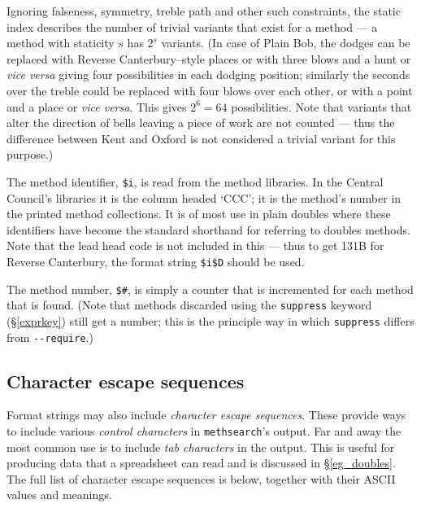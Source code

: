 \documentclass[a4paper,11pt,oneside]{book}
\def\textitidx#1{\textit{#1}\index{#1}}
\def\methsearch{\texttt{meth\-search}}
\newcommand{\sref}[1]{\hyperref[#1]{\S\ref{#1}}}
\begin{document}
Ignoring falseness,
symmetry, treble path and other such constraints, the static index describes
the number of trivial variants that exist for a method
--- a method with staticity $s$ has $2^s$ variants.  
(In case of Plain Bob, the dodges can be replaced with 
Reverse Canterbury--style places 
or with three blows and a hunt or \textit{vice versa} giving four 
possibilities in each dodging position; 
similarly the seconds over the treble could be replaced with four blows over
each other, or with a point and a place or \textit{vice versa}.  This gives
$2^6=64$ possibilities.  Note that variants that alter the direction of bells
leaving a piece of work are not counted --- thus the difference between
Kent and Oxford is not 
considered a trivial variant for this purpose.)

The method identifier, \verb+$i+, is read from the method libraries.  
In the Central Council's libraries it is the column headed `CCC';  
it is the method's number in the printed method collections.  It is of
most use in plain doubles where these identifiers have become the standard 
shorthand for referring to doubles methods.  Note that the lead head code
is not included in this --- thus to get 131B for Reverse Canterbury, the
format string \verb+$i$D+ should be used.

The method number, \verb+$#+, is simply a counter that is incremented for 
each method that is found.  (Note that methods discarded using the 
\verb+suppress+ keyword (\sref{exprkey})%
still get a number; this is the principle way in which \verb+suppress+
differs from \verb+--require+.)

\subsection{Character escape sequences}\label{charesc}

Format strings may also include \textit{character escape sequences}.  
These provide ways to include various \textitidx{control characters} in 
\methsearch's output.  Far and away the most common use is to include
\textit{tab characters} in the output.  This is useful
for producing data that a spreadsheet can read
and is discussed in \sref{eg_doubles}.
The full list of character escape sequences is below,
together with their ASCII values and meanings. 
\end{document}
